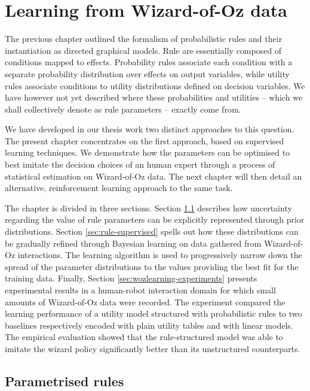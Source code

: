 
\chapter{Learning from Wizard-of-Oz data}
\label{chap:wozlearning}


The previous chapter outlined the formalism of probabilistic rules and their instantiation as directed graphical models. Rule are essentially composed of conditions mapped to effects. Probability rules associate each condition with a separate probability distribution over effects on output variables, while utility rules associate conditions to utility distributions defined on decision variables. We have however not yet described where these probabilities and utilities -- which we shall collectively denote as rule parameters -- exactly come from. 

We have developed in our thesis work two distinct approaches to this question. The present chapter concentrates on the first approach, based on supervised learning techniques. We demonstrate how the parameters can be optimised to best imitate the decision choices of an human expert through a process of statistical estimation on Wizard-of-Oz data. The next chapter will then detail an alternative, reinforcement learning approach to the same task.

The chapter is divided in three sections.  Section \ref{sec:rule-params} describes how uncertainty regarding the value of rule parameters can be explicitly represented through prior distributions. Section \ref{sec:rule-supervised} spells out how these distributions can be gradually refined through Bayesian learning on data gathered from Wizard-of-Oz interactions.  The learning algorithm  is used to progressively narrow down the spread of the parameter distributions to the values providing the best fit for the training data. Finally, Section \ref{sec:wozlearning-experiments} presents experimental results in a human-robot interaction domain for which small amounts of Wizard-of-Oz data were recorded. The experiment compared the learning performance of a utility model structured with probabilistic rules to two baselines respectively encoded with plain utility tables and with linear models. The empirical evaluation showed that the rule-structured model was able to imitate the wizard policy significantly better than its unstructured counterparts.

\section{Parametrised rules}
\label{sec:rule-params}

